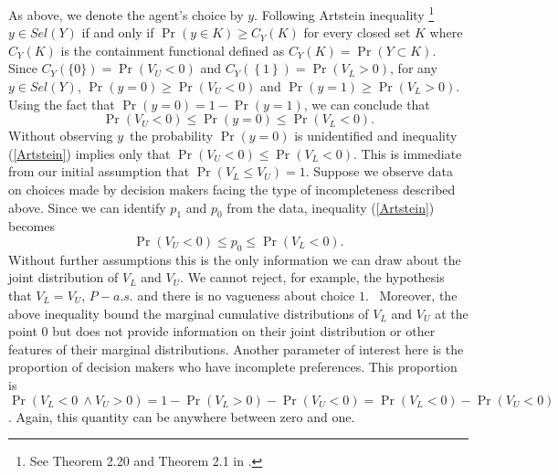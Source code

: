 \documentclass{article}
\renewcommand{\cite}{\citet}
\begin{document}
As above, we denote the agent's choice by $y$. Following Artstein inequality%
\footnote{%
See \cite{Molchanov2005} Theorem 2.20 and Theorem 2.1 in \cite{BMM2012}.} $%
y\in Sel\left( Y\right) $ if and only if $\Pr \left( y\in K\right) \geq
C_{Y}\left( K\right) $ for every closed set $K$ where $C_{Y}\left( K\right) $
is the containment functional defined as $C_{Y}\left( K\right) =\Pr \left(
Y\subset K\right) $. Since $C_{Y}\left( \{0\}\right) =\Pr \left(
V_{U}<0\right) $ and $C_{Y}\left( \left\{ 1\right\} \right) =\Pr \left(
V_{L}>0\right) $, for any $y\in Sel\left( Y\right) $, $\Pr (y=0)\geq \Pr
\left( V_{U}<0\right) $ and $\Pr \left( y=1\right) \geq \Pr \left(
V_{L}>0\right) $. Using the fact that $\Pr \left( y=0\right) =1-\Pr (y=1)$,
we can conclude that%
\begin{equation}
\Pr \left( V_{U}<0\right) \leq \Pr (y=0)\leq \Pr \left( V_{L}<0\right) .
\label{Artstein}
\end{equation}%
Without observing $y$\ the probability $\Pr \left( y=0\right) $ is
unidentified and inequality (\ref{Artstein}) implies only that $\Pr \left(
V_{U}<0\right) \leq \Pr \left( V_{L}<0\right) $. This is immediate from our
initial assumption that $\Pr \left( V_{L}\leq V_{U}\right) =1$. Suppose we
observe data on choices made by decision makers facing the type of
incompleteness described above. Since we can identify $p_{1}$ and $p_{0}$
from the data, inequality (\ref{Artstein}) becomes%
\begin{equation}
\Pr \left( V_{U}<0\right) \leq p_{0}\leq \Pr \left( V_{L}<0\right) .
\label{ineq1}
\end{equation}%
Without further assumptions this is the only information we can draw about
the joint distribution of $V_{L}$ and $V_{U}$. We cannot reject, for
example, the hypothesis that $V_{L}=V_{U}$, $P-a.s.$ and there is no
vagueness about choice $1$. \ Moreover, the above inequality bound the
marginal cumulative distributions of $V_{L}$ and $V_{U}$ at the point $0$
but does not provide information on their joint distribution or other
features of their marginal distributions. Another parameter of interest here
is the proportion of decision makers who have incomplete preferences. This
proportion is $\Pr \left( V_{L}<0\ \wedge V_{U}>0\right) =1-\Pr \left(
V_{L}>0\right) -\Pr \left( V_{U}<0\right) =\Pr \left( V_{L}<0\right) -\Pr
\left( V_{U}<0\right) $. Again, this quantity can be anywhere between zero
and one.
\end{document}
